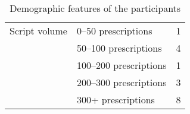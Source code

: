 \begin{table}[htb]
\begin{tabular}{llc}
Script volume     & 0--50 prescriptions                                                                                                            & 1  \\
                  & 50--100 prescriptions                                                                                                          & 4  \\
                  & 100--200 prescriptions                                                                                                         & 1  \\
                  & 200--300 prescriptions                                                                                                         & 3  \\
                  & 300+ prescriptions                                                                                                             & 8\\
\bottomrule
\end{tabular}
\caption{Demographic features of the participants}
\end{table}